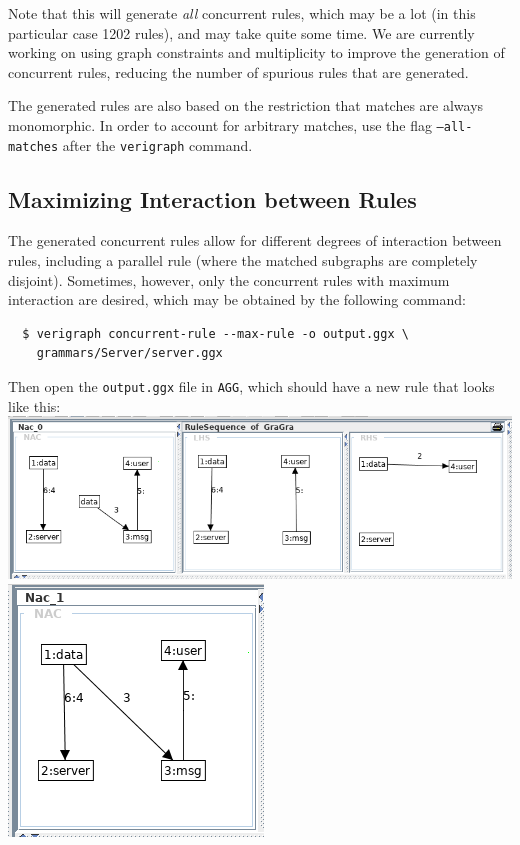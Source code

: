 \documentclass[12pt]{article}
\newenvironment{tutorialstep}
	{\hspace{-\parindent}\begin{minipage}{\textwidth}}
    {\vspace{.3cm}\end{minipage}}
\begin{document}
Note that this will generate \emph{all} concurrent rules, which may be a lot (in this particular case 1202 rules), and may take quite some time. We are currently working on using graph constraints and multiplicity to improve the generation of concurrent rules, reducing the number of spurious rules that are generated.

The generated rules are also based on the restriction that matches are always monomorphic. In order to account for arbitrary matches, use the flag \texttt{--all-matches} after the \texttt{verigraph} command.

\subsection{Maximizing Interaction between Rules}

The generated concurrent rules allow for different degrees of interaction between rules, including a parallel rule (where the matched subgraphs are completely disjoint). Sometimes, however, only the concurrent rules with maximum interaction are desired, which may be obtained by the following command:

\begin{verbatim}
  $ verigraph concurrent-rule --max-rule -o output.ggx \
    grammars/Server/server.ggx
\end{verbatim}

\begin{tutorialstep}
  Then open the \texttt{output.ggx} file in \texttt{AGG}, which should have a new rule that looks like this:\\

  \noindent
  \includegraphics[scale = 0.5]{rule-sequence_04a.png}\\
  \noindent
  \includegraphics[scale = 0.5]{rule-sequence_04b.png}\\
\end{tutorialstep}
\end{document}
